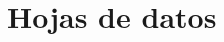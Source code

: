 \pagestyle{allpages}

\appendix


\appendixpage
\addappheadtotoc



\section{Hojas de datos}



\clearpage






